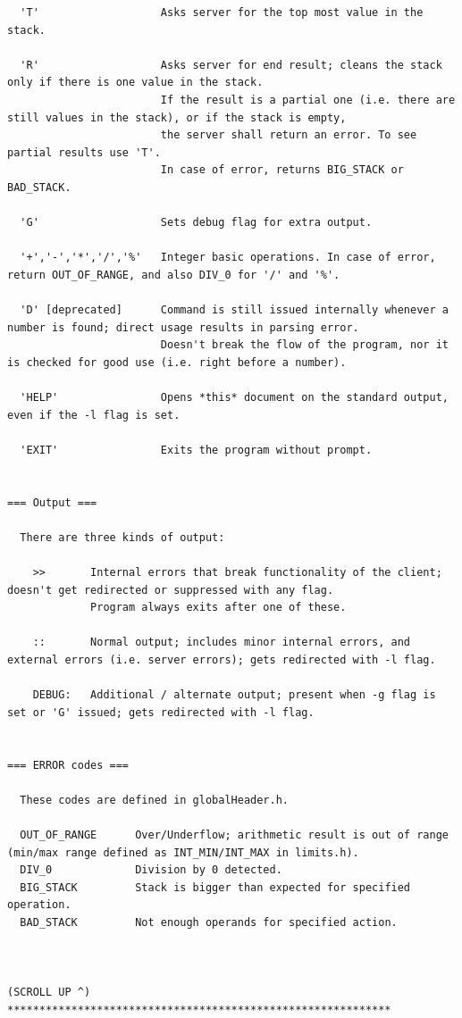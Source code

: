 \begin{lstlisting}
  'T'                   Asks server for the top most value in the stack.

  'R'                   Asks server for end result; cleans the stack only if there is one value in the stack.
                        If the result is a partial one (i.e. there are still values in the stack), or if the stack is empty,
                        the server shall return an error. To see partial results use 'T'.
                        In case of error, returns BIG_STACK or BAD_STACK.

  'G'                   Sets debug flag for extra output.

  '+','-','*','/','%'   Integer basic operations. In case of error, return OUT_OF_RANGE, and also DIV_0 for '/' and '%'.

  'D' [deprecated]      Command is still issued internally whenever a number is found; direct usage results in parsing error.
                        Doesn't break the flow of the program, nor it is checked for good use (i.e. right before a number).

  'HELP'                Opens *this* document on the standard output, even if the -l flag is set.

  'EXIT'                Exits the program without prompt.


=== Output ===

  There are three kinds of output:

    >>       Internal errors that break functionality of the client; doesn't get redirected or suppressed with any flag.
             Program always exits after one of these.

    ::       Normal output; includes minor internal errors, and external errors (i.e. server errors); gets redirected with -l flag.

    DEBUG:   Additional / alternate output; present when -g flag is set or 'G' issued; gets redirected with -l flag.


=== ERROR codes ===

  These codes are defined in globalHeader.h.

  OUT_OF_RANGE      Over/Underflow; arithmetic result is out of range (min/max range defined as INT_MIN/INT_MAX in limits.h).
  DIV_0             Division by 0 detected.
  BIG_STACK         Stack is bigger than expected for specified operation.
  BAD_STACK         Not enough operands for specified action.



(SCROLL UP ^)
************************************************************

\end{lstlisting}

